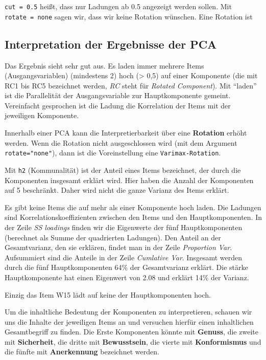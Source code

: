 \documentclass[12pt,ngerman,]{book}
\theoremstyle{definition}
\theoremstyle{definition}
\theoremstyle{remark}
\begin{document}
\texttt{cut\ =\ 0.5} heißt, dass nur Ladungen ab 0.5 angezeigt werden
sollen. Mit \texttt{rotate\ =\ \textquotesingle{}none\textquotesingle{}}
sagen wir, dass wir keine Rotation wünschen. Eine Rotation ist

\subsection{Interpretation der Ergebnisse der
PCA}\label{interpretation-der-ergebnisse-der-pca}

Das Ergebnis sieht sehr gut aus. Es laden immer mehrere Items
(Ausgangsvariablen) (mindestens 2) hoch (\textgreater{} 0,5) auf einer
Komponente (die mit RC1 bis RC5 bezeichnet werden, \emph{RC} steht für
\emph{Rotated Component}). Mit ``laden'' ist die Parallelität der
Ausgangsvariable zur Hauptkomponente gemeint. Vereinfacht gesprochen ist
die Ladung die Korrelation der Items mit der jeweiligen Komponente.

Innerhalb einer PCA kann die Interpretierbarkeit über eine
\textbf{Rotation} erhöht werden. Wenn die Rotation nicht ausgeschlossen
wird (mit dem Argument \texttt{rotate="none"}), dann ist die
Voreinstellung eine \texttt{Varimax-Rotation}.

Mit \texttt{h2} (Kommunalität) ist der Anteil eines Items bezeichnet,
der durch die Komponenten insgesamt erklärt wird. Hier haben die Anzahl
der Komponenten auf 5 beschränkt. Daher wird nicht die ganze Varianz des
Items erklärt.

Es gibt keine Items die auf mehr als einer Komponente hoch laden. Die
Ladungen sind Korrelationskoeffizienten zwischen den Items und den
Hauptkomponenten. In der Zeile \emph{SS loadings} finden wir die
Eigenwerte der fünf Hauptkomponenten (berechnet als Summe der
quadrierten Ladungen). Den Anteil an der Gesamtvarianz, den sie
erklären, findet man in der Zeile \emph{Proportion Var}. Aufsummiert
sind die Anteile in der Zeile \emph{Cumlative Var}. Insgesamt werden
durch die fünf Hauptkomponenten 64\% der Gesamtvarianz erklärt. Die
stärke Hauptkomponente hat einen Eigenwert von 2.08 und erklärt 14\% der
Varianz.

Einzig das Item W15 lädt auf keine der Hauptkomponenten hoch.

Um die inhaltliche Bedeutung der Komponenten zu interpretieren, schauen
wir uns die Inhalte der jeweiligen Items an und versuchen hierfür einen
inhaltlichen Gesamtbegriff zu finden. Die Erste Komponenten könnte mit
\textbf{Genuss}, die zweite mit \textbf{Sicherheit}, die dritte mit
\textbf{Bewusstsein}, die vierte mit \textbf{Konformismus} und die
fünfte mit \textbf{Anerkennung} bezeichnet werden.
\end{document}
